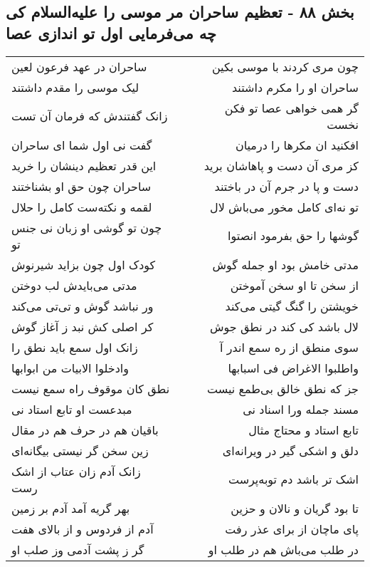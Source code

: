 \begin{center}
\section*{بخش ۸۸ - تعظیم ساحران مر موسی را علیه‌السلام کی چه می‌فرمایی اول تو اندازی عصا}
\label{sec:sh088}
\begin{longtable}{l p{0.5cm} r}
ساحران در عهد فرعون لعین
&&
چون مری کردند با موسی بکین
\\
لیک موسی را مقدم داشتند
&&
ساحران او را مکرم داشتند
\\
زانک گفتندش که فرمان آن تست
&&
گر همی خواهی عصا تو فکن نخست
\\
گفت نی اول شما ای ساحران
&&
افکنید ان مکرها را درمیان
\\
این قدر تعظیم دینشان را خرید
&&
کز مری آن دست و پاهاشان برید
\\
ساحران چون حق او بشناختند
&&
دست و پا در جرم آن در باختند
\\
لقمه و نکته‌ست کامل را حلال
&&
تو نه‌ای کامل مخور می‌باش لال
\\
چون تو گوشی او زبان نی جنس تو
&&
گوشها را حق بفرمود انصتوا
\\
کودک اول چون بزاید شیرنوش
&&
مدتی خامش بود او جمله گوش
\\
مدتی می‌بایدش لب دوختن
&&
از سخن تا او سخن آموختن
\\
ور نباشد گوش و تی‌تی می‌کند
&&
خویشتن را گنگ گیتی می‌کند
\\
کر اصلی کش نبد ز آغاز گوش
&&
لال باشد کی کند در نطق جوش
\\
زانک اول سمع باید نطق را
&&
سوی منطق از ره سمع اندر آ
\\
وادخلوا الابیات من ابوابها
&&
واطلبوا الاغراض فی اسبابها
\\
نطق کان موقوف راه سمع نیست
&&
جز که نطق خالق بی‌طمع نیست
\\
مبدعست او تابع استاد نی
&&
مسند جمله ورا اسناد نی
\\
باقیان هم در حرف هم در مقال
&&
تابع استاد و محتاج مثال
\\
زین سخن گر نیستی بیگانه‌ای
&&
دلق و اشکی گیر در ویرانه‌ای
\\
زانک آدم زان عتاب از اشک رست
&&
اشک تر باشد دم توبه‌پرست
\\
بهر گریه آمد آدم بر زمین
&&
تا بود گریان و نالان و حزین
\\
آدم از فردوس و از بالای هفت
&&
پای ماچان از برای عذر رفت
\\
گر ز پشت آدمی وز صلب او
&&
در طلب می‌باش هم در طلب او
\\

\end{longtable}
\end{center}
